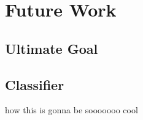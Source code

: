 \documentclass[../ClassicThesis.tex]{subfiles}
\begin{document}
\chapter{Future Work}\label{ch:futurework}

\section{Ultimate Goal}
\section{Classifier}

how this is gonna be sooooooo cool
\end{document}

